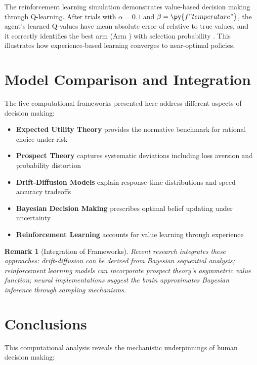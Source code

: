 \documentclass[a4paper, 11pt]{article}
\newtheorem{remark}{Remark}[section]
\begin{document}
{{The reinforcement learning simulation demonstrates value-based decision making through Q-learning.
After  trials with $\alpha = 0.1$ and $\beta = \py{f"{temperature}"}$, the agent's
learned Q-values have mean absolute error of  relative to true values,
and it correctly identifies the best arm (Arm ) with selection probability
. This illustrates how experience-based learning
converges to near-optimal policies.

\section{Model Comparison and Integration}

The five computational frameworks presented here address different aspects of decision making:

\begin{itemize}
\item \textbf{Expected Utility Theory} provides the normative benchmark for rational choice under risk
\item \textbf{Prospect Theory} captures systematic deviations including loss aversion and probability distortion
\item \textbf{Drift-Diffusion Models} explain response time distributions and speed-accuracy tradeoffs
\item \textbf{Bayesian Decision Making} prescribes optimal belief updating under uncertainty
\item \textbf{Reinforcement Learning} accounts for value learning through experience
\end{itemize}

\begin{remark}[Integration of Frameworks]
Recent research integrates these approaches: drift-diffusion can be derived from Bayesian sequential
analysis; reinforcement learning models can incorporate prospect theory's asymmetric value function;
neural implementations suggest the brain approximates Bayesian inference through sampling mechanisms.
\end{remark}

\section{Conclusions}

This computational analysis reveals the mechanistic underpinnings of human decision making:

}}
\end{document}
